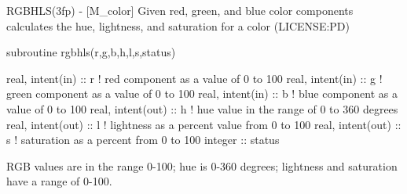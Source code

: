 \begin{DoxyDescription}
\item[\label{_RGBHLS}%
N\+A\+ME ]R\+G\+B\+H\+L\+S(3fp) -\/ \mbox{[}M\+\_\+color\mbox{]} Given red, green, and blue color components calculates the hue, lightness, and saturation for a color (L\+I\+C\+E\+N\+SE\+:PD) 


\item[S\+Y\+N\+O\+P\+S\+IS ]
\begin{DoxyPre}\end{DoxyPre}



\begin{DoxyPre}    subroutine rgbhls(r,g,b,h,l,s,status)\end{DoxyPre}



\begin{DoxyPre}     real, intent(in)  :: r ! red component as a value of 0 to 100
     real, intent(in)  :: g ! green component as a value of 0 to 100
     real, intent(in)  :: b ! blue component as a value of 0 to 100
     real, intent(out) :: h ! hue value in the range of 0 to 360 degrees
     real, intent(out) :: l ! lightness as a percent value from 0 to 100
     real, intent(out) :: s ! saturation as a percent from 0 to 100
     integer           :: status
    \end{DoxyPre}
 


\item[D\+E\+S\+C\+R\+I\+P\+T\+I\+ON ]

R\+GB values are in the range 0-\/100; hue is 0-\/360 degrees; lightness and saturation have a range of 0-\/100. ~\newline
~\newline



\end{DoxyDescription}

